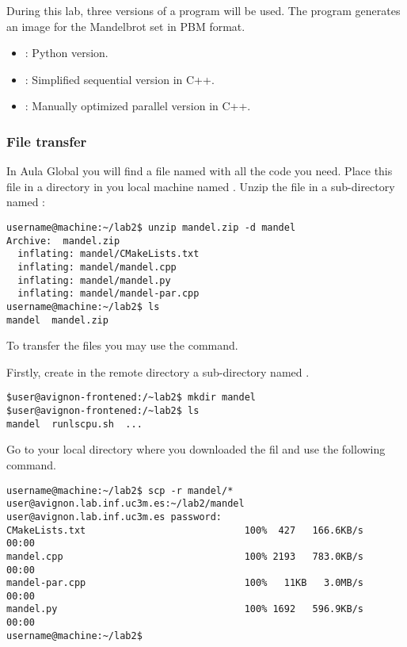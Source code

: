 During this lab, three versions of a program will be used.
The program generates an image for the Mandelbrot set in PBM format.

\begin{itemize}
  \item {}: Python version.
  \item {}: Simplified sequential version in C++.
  \item {}: Manually optimized parallel version in C++.
\end{itemize}

\subsubsection{File transfer}

In Aula Global you will find a file named  with all the code you need.
Place this file in a directory in you local machine named .
Unzip the file in a sub-directory named :

\begin{lstlisting}[style=terminal]
username@machine:~/lab2$ unzip mandel.zip -d mandel
Archive:  mandel.zip
  inflating: mandel/CMakeLists.txt   
  inflating: mandel/mandel.cpp       
  inflating: mandel/mandel.py        
  inflating: mandel/mandel-par.cpp   
username@machine:~/lab2$ ls
mandel  mandel.zip
\end{lstlisting}

To transfer the files you may use the  command.

Firstly, create in the remote directory a sub-directory named .

\begin{lstlisting}[style=terminal]
$user@avignon-frontened:/~lab2$ mkdir mandel
$user@avignon-frontened:/~lab2$ ls
mandel  runlscpu.sh  ...
\end{lstlisting}

Go to your local directory where you downloaded the  fil and 
use the following command.

\begin{lstlisting}[style=terminal,basicstyle=\tiny\ttfamily,columns=fixed]
username@machine:~/lab2$ scp -r mandel/* user@avignon.lab.inf.uc3m.es:~/lab2/mandel
user@avignon.lab.inf.uc3m.es password: 
CMakeLists.txt                            100%  427   166.6KB/s   00:00    
mandel.cpp                                100% 2193   783.0KB/s   00:00    
mandel-par.cpp                            100%   11KB   3.0MB/s   00:00    
mandel.py                                 100% 1692   596.9KB/s   00:00    
username@machine:~/lab2$ 
\end{lstlisting}

